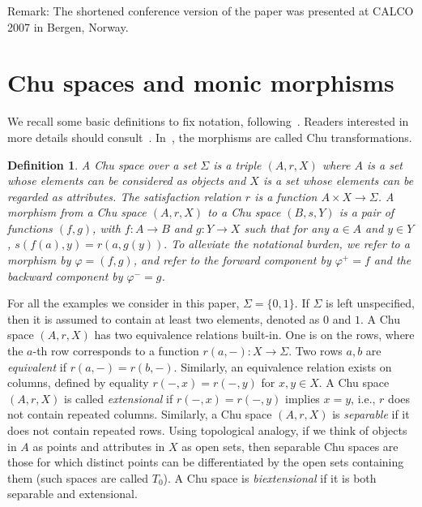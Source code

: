 \documentclass{LMCS}
\newtheorem{defn}{Definition}[section]
\begin{document}
Remark: The shortened conference version of the paper was presented at CALCO 2007 in Bergen, Norway.

\section{Chu spaces and monic morphisms}

\noindent We recall some basic definitions to fix notation,
following~\cite{pratt0}.  Readers interested in more details should
consult~\cite{pratt2}.  In~\cite{pratt2}, the morphisms are called Chu
transformations.

\begin{defn}
A Chu space over a set $\Sigma$ is a triple $(A, r, X)$
where $A$ is a set whose elements can be considered as {\em objects} and $X$ is a set
whose elements can be regarded as {\em attributes}.
The satisfaction relation $r$ is a
function $A \times X\to \Sigma$.
A morphism   from a Chu space $(A, r, X)$
to a Chu space $(B, s, Y)$
is a pair of functions $(f, g)$, with
$f: A\rightarrow B$ and $g: Y\rightarrow X$
such that for any $a\in A$ and $y\in Y$,
$s(f(a),y) = r(a, g(y)).$
To alleviate the notational burden, we refer to a morphism
by $\varphi = (f,g)$, and refer to the forward component by
$\varphi^+ =f$ and the backward component by $\varphi^-=g$.
\end{defn}



For all the examples we consider in this paper, $\Sigma = \{0,1\}$.
If $\Sigma$ is left unspecified, then it is assumed to contain at least two
elements, denoted as $0$ and $1$.
A Chu space  $(A, r, X)$ has two equivalence relations built-in.
One is on the rows, where the $a$-th row corresponds
to a function $r(a, -) : X\to \Sigma$.
Two rows $a,b$ are {\em equivalent} if $r(a, -)=r(b, -)$. Similarly,
an equivalence relation exists on columns, defined by equality $r(-, x)=r(-, y)$
for $x, y \in X$.
A Chu space  $(A, r, X)$ is  called {\em extensional} if $r(-, x) =r(-, y)$ implies $x=y$,
i.e., $r$ does not contain repeated columns. Similarly, a  Chu space $(A, r, X)$
is {\em separable} if it does not contain repeated rows. Using  topological
analogy, if we think of objects in $A$ as points and attributes in $X$ as open sets,
then separable Chu spaces are those for which distinct points can be differentiated by
the open sets containing them (such spaces are called $T_0$).
A Chu space is {\em biextensional} if it is
both separable and extensional.
\end{document}
